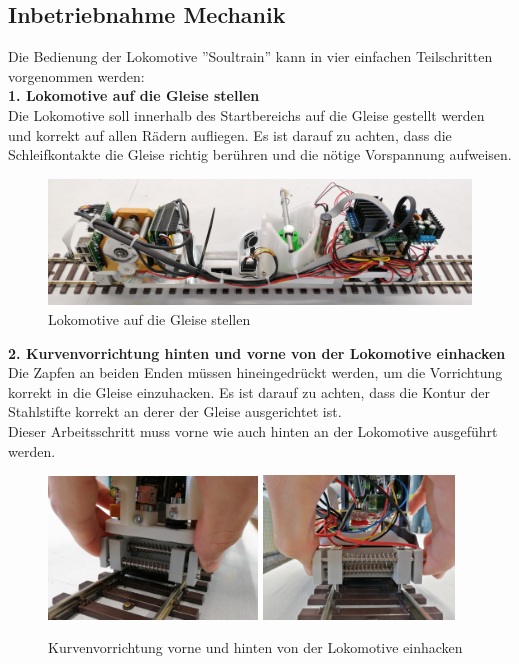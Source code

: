 \documentclass[../../main.tex]{subfiles}
\begin{document}
\subsection{Inbetriebnahme Mechanik}

Die Bedienung der Lokomotive ''Soultrain'' kann in vier einfachen Teilschritten vorgenommen werden:\\

\textbf{1. Lokomotive auf die Gleise stellen}\\
Die Lokomotive soll innerhalb des Startbereichs auf die Gleise gestellt werden und korrekt auf allen Rädern aufliegen.
Es ist darauf zu achten, dass die Schleifkontakte die Gleise richtig berühren und die nötige Vorspannung aufweisen.

\begin{figure}[H]
  \centering
  \includegraphics[width=1\textwidth]{montagezug.PNG}
  \caption {Lokomotive auf die Gleise stellen}
  \label{fig:montagezug}
\end{figure}

\textbf{2. Kurvenvorrichtung hinten und vorne von der Lokomotive einhacken}\\
Die Zapfen an beiden Enden müssen hineingedrückt werden, um die Vorrichtung korrekt in die Gleise einzuhacken. Es ist darauf zu achten, dass die Kontur der Stahlstifte korrekt an derer der Gleise ausgerichtet ist.\\
Dieser Arbeitsschritt muss vorne wie auch hinten an der Lokomotive ausgeführt werden.

\begin{figure}[H]
  \centering
  \includegraphics[width=0.495\textwidth]{../../images/Maschinentechnik/montagevorne.PNG}
  \includegraphics[width=0.455\textwidth]{../../images/Maschinentechnik/montagehinten.PNG}
  \caption {Kurvenvorrichtung vorne und hinten von der Lokomotive einhacken}
\end{figure}
\end{document}
